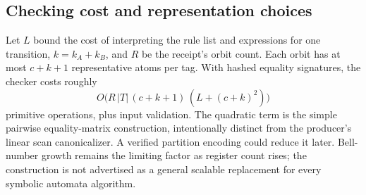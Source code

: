 \subsection{Checking cost and representation choices}
Let $L$ bound the cost of interpreting the rule list and expressions for one
transition, $k=k_A+k_B$, and $R$ be the receipt's orbit count. Each orbit has at
most $c+k+1$ representative atoms per tag. With hashed equality signatures,
the checker costs roughly
\[
 O\bigl(R\,|T|\,(c+k+1)\,(L+(c+k)^2)\bigr)
\]
primitive operations, plus input validation. The quadratic term is the simple
pairwise equality-matrix construction, intentionally distinct from the
producer's linear scan canonicalizer. A verified partition encoding could
reduce it later. Bell-number growth remains the limiting factor as register
count rises; the construction is not advertised as a general scalable
replacement for every symbolic automata algorithm.
